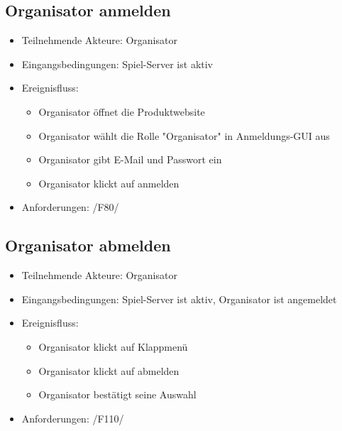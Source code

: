 \documentclass[a4paper]{scrreprt}
\begin{document}
    \subsection{Organisator anmelden}
    \begin{itemize}
        \item Teilnehmende Akteure: \Gls{Organisator}
        \item Eingangsbedingungen: \Gls{Spiel-Server} ist aktiv
        \item Ereignisfluss:
        \begin{itemize}
            \item \Gls{Organisator} öffnet die Produktwebsite
            \item \Gls{Organisator} wählt die Rolle "\Gls{Organisator}" in Anmeldungs-GUI aus
            \item \Gls{Organisator} gibt E-Mail und Passwort ein
            \item \Gls{Organisator} klickt auf anmelden
        \end{itemize}
        \item Anforderungen: /F80/
    \end{itemize}

    \subsection{Organisator abmelden}
    \begin{itemize}
        \item Teilnehmende Akteure: \Gls{Organisator}
        \item Eingangsbedingungen: \Gls{Spiel-Server} ist aktiv, \Gls{Organisator} ist angemeldet
        \item Ereignisfluss:
        \begin{itemize}
            \item \Gls{Organisator} klickt auf Klappmenü
            \item \Gls{Organisator} klickt auf abmelden
            \item \Gls{Organisator} bestätigt seine Auswahl
        \end{itemize}
        \item Anforderungen: /F110/
    \end{itemize}
\end{document}
